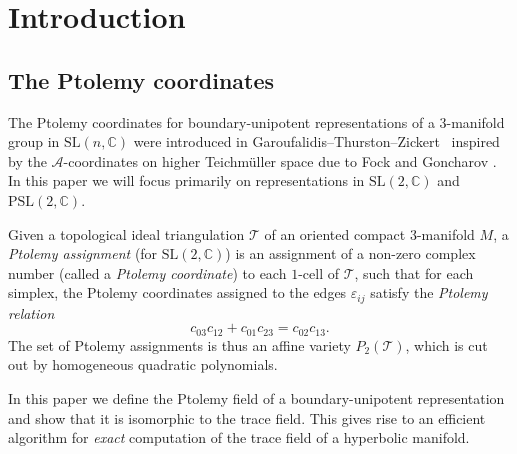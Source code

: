 \documentclass[12pt]{amsart}
\theoremstyle{definition}
\numberwithin{equation}{section}
\def\BC{\mathbb C}
\def\SL{\mathrm{SL}}
\def\PSL{\mathrm{PSL}}
\def\CT{\mathcal T}
\def\C{\mathbb{C}}
\def\T{\mathcal{T}}
\begin{document}
\tableofcontents

\section{Introduction}

\subsection{The Ptolemy coordinates}
\label{sub.ge}

The Ptolemy coordinates for boundary-unipotent representations of a 
3-manifold group in $\SL(n,\C)$ were introduced in 
Garoufalidis--Thurston--Zickert~\cite{GaroufalidisThurstonZickert} inspired by the $\mathcal A$-coordinates 
on higher Teichm\"{u}ller space due to Fock and Goncharov
\cite{FockGoncharov}. In this paper we will focus primarily on representations in $\SL(2,\C)$ and $\PSL(2,\C)$.  %

Given a topological ideal triangulation $\T$ of an oriented compact 3-manifold $M$, 
a \emph{Ptolemy assignment} (for $\SL(2,\C)$) is an assignment of a non-zero 
complex number (called a \emph{Ptolemy coordinate}) to each $1$-cell of $\CT$, such that for each simplex, the Ptolemy coordinates assigned to the edges $\varepsilon_{ij}$
satisfy the \emph{Ptolemy relation}
\begin{equation}\label{eq:PtolemyRelation}
c_{03}c_{12}+c_{01}c_{23}=c_{02}c_{13}.
\end{equation}
The set of Ptolemy assignments is thus an affine variety $P_2(\T)$, which is cut out by homogeneous quadratic polynomials. 

In this paper we define the Ptolemy field of a boundary-unipotent representation and show that it is isomorphic to the trace field. This gives rise to an efficient algorithm for \emph{exact} computation of the trace field of a hyperbolic manifold.


 
\end{document}
